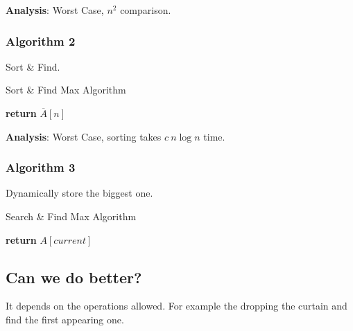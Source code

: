 \textbf{Analysis}: Worst Case, $n^2$ comparison.

\subsubsection{Algorithm 2}

Sort \& Find.

\begin{algorithm}[H]
\caption{Sort \& Find Max Algorithm}\label{Sort_and_Find_Max_Algorithm}
\begin{algorithmic}[1]
\State \textbf{return} {$\overline{A}[n]$}
\EndProcedure
\end{algorithmic}
\end{algorithm}

\textbf{Analysis}: Worst Case, sorting takes $c\ n\log n$ time.

\subsubsection{Algorithm 3}

Dynamically store the biggest one.

\begin{algorithm}[H]
\caption{Search \& Find Max Algorithm}\label{Search_and_Find_Max_Algorithm}
\begin{algorithmic}[1]
  \EndIf
\EndFor
\State \textbf{return} {$A[current]$}
\EndProcedure
\end{algorithmic}
\end{algorithm}

\subsection{Can we do better?}

It depends on the operations allowed. For example the dropping the curtain and
find the first appearing one.
